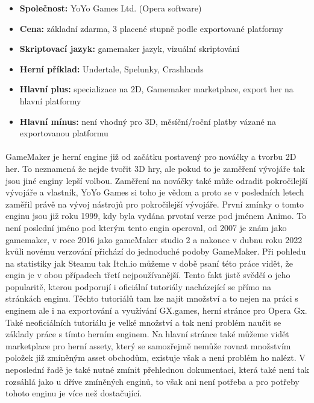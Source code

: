 \begin{itemize}
	\item \textbf{Společnost: } YoYo Games Ltd. (Opera software)
	\item \textbf{Cena: } základní zdarma, 3 placené stupně podle exportované platformy
	\item \textbf{Skriptovací jazyk: } gamemaker jazyk, vizuální skriptování
	\item \textbf{Herní příklad: } Undertale, Spelunky, Crashlands
	\item \textbf{Hlavní plus: } specializace na 2D, Gamemaker marketplace, export her na hlavní platformy
	\item \textbf{Hlavní mínus: } není vhodný pro 3D, měsíční/roční platby vázané na exportovanou platformu
\end{itemize}

\paragraph{}
	GameMaker je herní engine již od začátku postavený pro nováčky a tvorbu 2D her.
	To neznamená že nejde tvořit 3D hry, ale pokud to je zaměření vývojáře tak jsou jiné enginy lepší volbou.
	Zaměření na nováčky také může odradit pokročilejší vývojáře a vlastník, YoYo Games si toho je vědom a proto se v posledních letech zaměřil právě na vývoj nástrojů pro pokročilejší vývojáře.
	První zmínky o tomto enginu jsou již roku 1999, kdy byla vydána prvotní verze pod jménem Animo.
	To není poslední jméno pod kterým tento engin operoval, od 2007 je znám jako gamemaker, v roce 2016 jako gameMaker studio 2 a nakonec v dubnu roku 2022 kvůli novému verzování přichází do jednoduché podoby GameMaker.
	Při pohledu na statistiky jak Steamu\cite{steamdb_engines} tak Itch.io\cite{itch_io_engines} můžeme v době psaní této práce vidět, že engin je v obou případech třetí nejpoužívanější.
	Tento fakt jistě svědčí o jeho popularitě, kterou podporují i oficiální tutoriály nacházející se přímo na stránkách enginu\cite{gamemaker_tutorials}.
	Těchto tutoriálů tam lze najít množství a to nejen na práci s enginem ale i na exportování a využívání GX.games, herní stránce pro Opera Gx\cite{opera_gx_mainpage}.
	Také neoficiálních tutoriálu je velké množství a tak není problém naučit se základy práce s tímto herním enginem.
	Na hlavní stránce také můžeme vidět marketplace pro herní assety, který se samozřejmě nemůže rovnat množstvím položek již zmíněným asset obchodům, existuje však a není problém ho nalézt.
	V neposlední řadě je také nutné zmínit přehlednou dokumentaci\cite{gamemaker_manual}, která také není tak rozsáhlá jako u dříve zmíněných enginů, to však ani není potřeba a pro potřeby tohoto enginu je více než dostačující.

